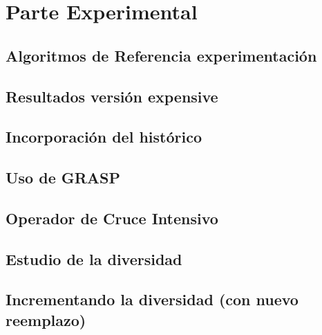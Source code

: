 \chapter*{Parte Experimental}

\section{Algoritmos de Referencia experimentación}

\section{Resultados versión expensive}

\section{Incorporación del histórico}

\section{Uso de GRASP}

\section{Operador de Cruce Intensivo}

\section{Estudio de la diversidad}

\section{Incrementando la diversidad (con nuevo reemplazo)}